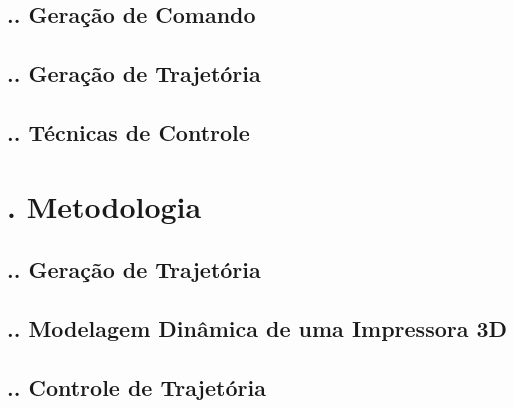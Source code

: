 \documentclass[aspectratio=169]{beamer}
\begin{document}
\subsection{\insertsectionnumber .\insertsubsectionnumber . Geração de Comando}
\begin{frame}
  \frametitle{\insertsubsection}
\end{frame}

\subsection{\insertsectionnumber .\insertsubsectionnumber . Geração de Trajetória}
\begin{frame}
  \frametitle{\insertsubsection}
\end{frame}

\subsection{\insertsectionnumber .\insertsubsectionnumber . Técnicas de Controle}
\begin{frame}
  \frametitle{\insertsubsection}
\end{frame}

\section{\insertsectionnumber . Metodologia}

\subsection{\insertsectionnumber .\insertsubsectionnumber . Geração de Trajetória}
\begin{frame}
  \frametitle{\insertsubsection}
\end{frame}

\subsection{\insertsectionnumber .\insertsubsectionnumber . Modelagem Dinâmica de uma Impressora 3D}
\begin{frame}
  \frametitle{\insertsubsection}
\end{frame}

\subsection{\insertsectionnumber .\insertsubsectionnumber . Controle de Trajetória}
\begin{frame}
  \frametitle{\insertsubsection}
\end{frame}
\end{document}
